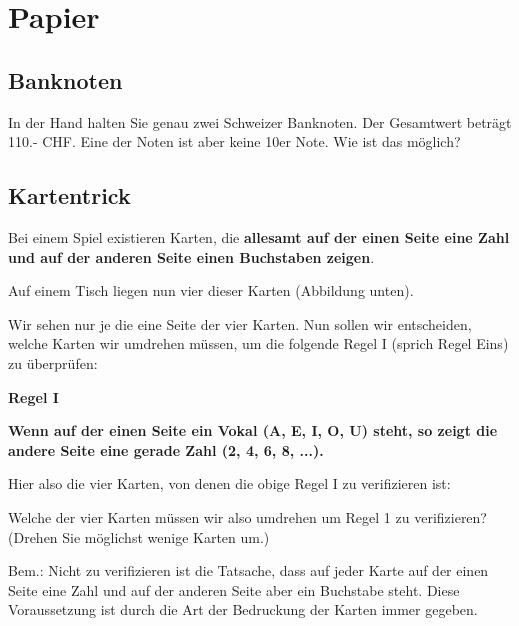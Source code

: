 \section{Papier}

\subsection{Banknoten}
In der Hand halten Sie genau zwei Schweizer Banknoten. Der Gesamtwert
beträgt 110.- CHF. Eine der Noten ist aber keine
10er Note. Wie ist das
möglich?

\TNTeop{}

\subsection{Kartentrick}

Bei einem Spiel existieren Karten, die \textbf{allesamt auf der einen Seite eine Zahl
und auf der anderen Seite einen Buchstaben zeigen}.

Auf einem Tisch liegen nun vier dieser Karten (Abbildung unten).

Wir sehen nur je die eine Seite der vier Karten. Nun sollen wir entscheiden,
welche Karten wir umdrehen müssen, um die folgende Regel I (sprich Regel
Eins) zu überprüfen:

\begin{center}\textbf{Regel I}\end{center}

\begin{center}\textbf{Wenn auf der einen Seite ein Vokal (A, E, I, O, U) steht,
so zeigt die andere Seite eine gerade Zahl (2, 4, 6, 8, ...).}
\end{center}

Hier also die vier Karten, von denen die obige Regel I zu verifizieren ist:


Welche der vier Karten müssen wir also umdrehen um Regel 1 zu verifizieren?
(Drehen Sie möglichst wenige Karten um.)

Bem.: Nicht zu verifizieren ist die Tatsache, dass auf jeder Karte auf der einen
Seite eine Zahl und auf der anderen Seite aber ein Buchstabe steht. Diese
Voraussetzung ist durch die Art der Bedruckung der Karten immer gegeben.


\TNTeop{}


